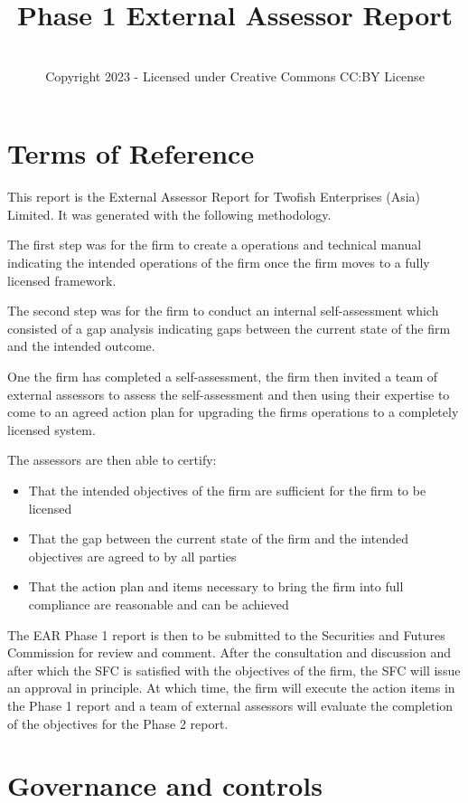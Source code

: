 \documentclass[]{report}
\title{Phase 1 External Assessor Report}
\author{\firmfullname\\Copyright 2023 - Licensed under Creative
  Commons CC:BY License}
\def\firmfullname{Twofish Enterprises (Asia) Limited}
\begin{document}
\maketitle
\section{Terms of Reference}

This report is the External Assessor Report for \firmfullname.  It was
generated with the following methodology.

The first step was for the firm to create a operations and technical
manual indicating the intended operations of the firm once the firm
moves to a fully licensed framework.

The second step was for the firm to conduct an internal
self-assessment which consisted of a gap analysis indicating gaps
between the current state of the firm and the intended outcome.

One the firm has completed a self-assessment, the firm then invited a
team of external assessors to assess the self-assessment and then
using their expertise to come to an agreed action plan for upgrading
the firms operations to a completely licensed system.

The assessors are then able to certify:

\begin{itemize}
  \item That the intended objectives of the firm are sufficient for
    the firm to be licensed
  \item That the gap between the current state of the firm and the
    intended objectives are agreed to by all parties
  \item That the action plan and items necessary to bring the firm
    into full compliance are reasonable and can be achieved
\end{itemize}

The EAR Phase 1 report is then to be submitted to the Securities and
Futures Commission for review and comment.  After the consultation and
discussion and after which the SFC is satisfied with the objectives of
the firm, the SFC will issue an approval in principle.  At which time,
the firm will execute the action items in the Phase 1 report and a
team of external assessors will evaluate the completion of the
objectives for the Phase 2 report.

\section{Governance and controls}
\end{document}
